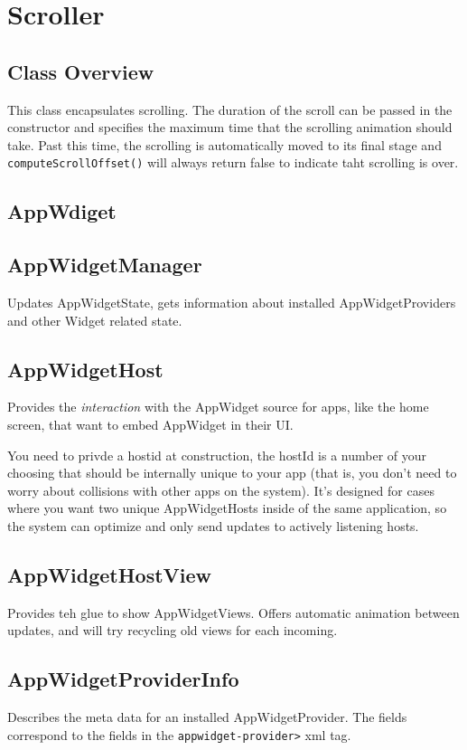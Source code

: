 \documentclass[11pt, a4paper]{book}
\begin{document}
\chapter{Scroller}
\section{Class Overview}
This class encapsulates scrolling. The duration of the scroll can be passed
 in the constructor and specifies the maximum time that the scrolling animation
should take. Past this time, the scrolling is automatically moved to its final
stage and \verb|computeScrollOffset()| will always return false to indicate taht
scrolling is over.

\section{AppWdiget}
\section{AppWidgetManager}
Updates AppWidgetState, gets information about installed AppWidgetProviders and
other Widget related state.
\section{AppWidgetHost}
Provides the \emph{interaction} with the AppWidget source for apps, like the
home screen, that want to embed AppWidget in their UI.

You need to privde a hostid at construction, the hostId is a number of your 
choosing that should be internally unique to your app (that is, you don't 
need to worry about collisions with other apps on the system).  It's designed 
for cases where you want two unique AppWidgetHosts inside of the same 
application, so the system can optimize and only send updates to actively 
listening hosts. 

\section{AppWidgetHostView}
Provides teh glue to show AppWidgetViews. Offers automatic animation between
updates, and will try recycling old views for each incoming.
\section{AppWidgetProviderInfo}
Describes the meta data for an installed AppWidgetProvider. The fields
correspond to the fields in the \verb|appwidget-provider>| xml tag.
\end{document}
